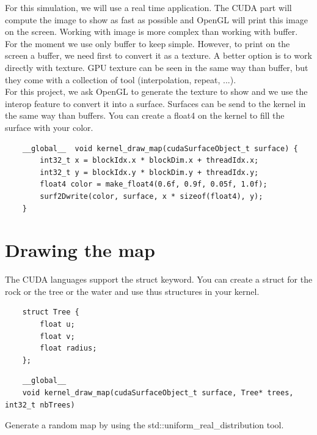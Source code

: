 \documentclass{article}
\begin{document}
For this simulation, we will use a real time application. The CUDA part will compute the image to show as fast as possible and OpenGL will print this image on the screen. Working with image is more complex than working with buffer. For the moment we use only buffer to keep simple. However, to print on the screen a buffer, we need first to convert it as a texture. A better option is to work directly with texture. GPU texture can be seen in the same way than buffer, but they come with a collection of tool (interpolation, repeat, ...).\\
For this project, we ask OpenGL to generate the texture to show and we use the interop feature to convert it into a surface. Surfaces can be send to the kernel in the same way than buffers. You can create a float4 on the kernel to fill the surface with your color.
\begin{lstlisting}
	__global__  void kernel_draw_map(cudaSurfaceObject_t surface) {
		int32_t x = blockIdx.x * blockDim.x + threadIdx.x;
		int32_t y = blockIdx.y * blockDim.y + threadIdx.y;
		float4 color = make_float4(0.6f, 0.9f, 0.05f, 1.0f);
		surf2Dwrite(color, surface, x * sizeof(float4), y);
	}
\end{lstlisting}

\section{Drawing the map}
The CUDA languages support the struct keyword. You can create a struct for the rock or the tree or the water and use thus structures in your kernel.
\begin{lstlisting}
	struct Tree {
		float u;
		float v;
		float radius;
	};
\end{lstlisting}
\begin{lstlisting}
	__global__ 
	void kernel_draw_map(cudaSurfaceObject_t surface, Tree* trees, int32_t nbTrees)
\end{lstlisting}
Generate a random map by using the std::uniform\_real\_distribution tool.
\end{document}
